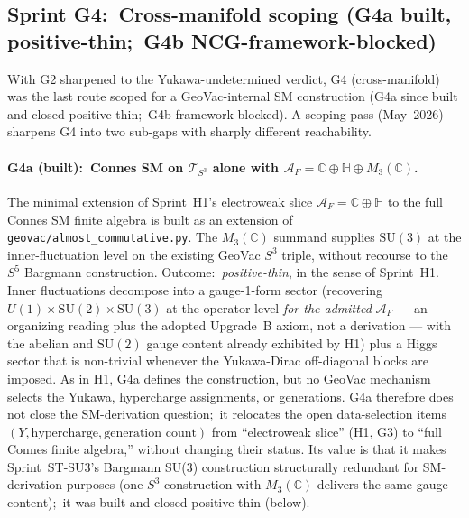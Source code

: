 \documentclass[11pt]{article}
\begin{document}
\subsection{Sprint G4:\ Cross-manifold scoping (G4a built, positive-thin;\ G4b
NCG-framework-blocked)}
\label{sec:g4}

With G2 sharpened to the Yukawa-undetermined verdict, G4
(cross-manifold) was the last route scoped for a GeoVac-internal SM
construction (G4a since built and closed positive-thin;\ G4b
framework-blocked).  A scoping pass (May~2026) sharpens G4
into two sub-gaps with sharply different reachability.

\paragraph{G4a (built):\ Connes SM on $\mathcal{T}_{S^3}$ alone
with $\mathcal{A}_F = \mathbb{C} \oplus \mathbb{H} \oplus
M_3(\mathbb{C})$.}  The minimal extension of Sprint~H1's electroweak
slice $\mathcal{A}_F = \mathbb{C} \oplus \mathbb{H}$ to the full
Connes SM finite algebra is built as an extension of
\texttt{geovac/almost\_commutative.py}.  The
$M_3(\mathbb{C})$ summand supplies $\mathrm{SU}(3)$ at the
inner-fluctuation level on the existing GeoVac $S^3$ triple, without
recourse to the $S^5$ Bargmann construction.  Outcome:\
\emph{positive-thin}, in the sense of Sprint~H1.  Inner fluctuations decompose into a gauge-1-form sector
(recovering $U(1) \times \mathrm{SU}(2) \times \mathrm{SU}(3)$ at the
operator level \emph{for the admitted} $\mathcal{A}_F$ --- an organizing
reading plus the adopted Upgrade~B axiom, not a derivation --- with the abelian and $\mathrm{SU}(2)$ gauge content already
exhibited by H1) plus a Higgs sector that is non-trivial whenever the
Yukawa-Dirac off-diagonal blocks are imposed.  As in H1, G4a defines the construction, but no GeoVac
mechanism selects the Yukawa, hypercharge assignments, or
generations.  G4a therefore does not close the SM-derivation
question;\ it relocates the open data-selection items
$(Y, \text{hypercharge}, \text{generation count})$ from
``electroweak slice'' (H1, G3) to ``full Connes finite algebra,''
without changing their status.  Its value is that it makes
Sprint~ST-SU3's Bargmann SU(3) construction structurally redundant for
SM-derivation purposes (one $S^3$ construction with $M_3(\mathbb{C})$
delivers the same gauge content);\ it was built and closed
positive-thin (below).
\end{document}
